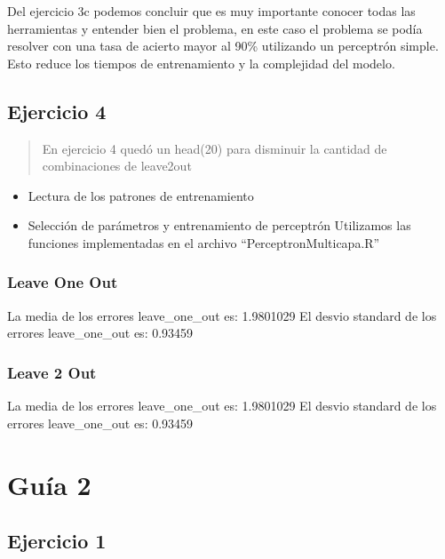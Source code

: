 \documentclass[]{book}
\begin{document}
Del ejercicio 3c podemos concluir que es muy importante conocer todas las herramientas y entender bien el problema, en este caso el problema se podía resolver con una tasa de acierto mayor al 90\% utilizando un perceptrón simple. Esto reduce los tiempos de entrenamiento y la complejidad del modelo.

\hypertarget{ejercicio-4}{%
\section{Ejercicio 4}\label{ejercicio-4}}

\begin{quote}
En ejercicio 4 quedó un head(20) para disminuir la cantidad de combinaciones de leave2out
\end{quote}

\begin{itemize}
\item
  Lectura de los patrones de entrenamiento
\item
  Selección de parámetros y entrenamiento de perceptrón
  Utilizamos las funciones implementadas en el archivo ``PerceptronMulticapa.R''
\end{itemize}

\hypertarget{leave-one-out}{%
\subsection{Leave One Out}\label{leave-one-out}}

La media de los errores leave\_one\_out es: 1.9801029
El desvio standard de los errores leave\_one\_out es: 0.93459

\hypertarget{leave-2-out}{%
\subsection{Leave 2 Out}\label{leave-2-out}}

La media de los errores leave\_one\_out es: 1.9801029
El desvio standard de los errores leave\_one\_out es: 0.93459

\hypertarget{guia-2}{%
\chapter{Guía 2}\label{guia-2}}

\hypertarget{ejercicio-1-1}{%
\section{Ejercicio 1}\label{ejercicio-1-1}}
\end{document}
